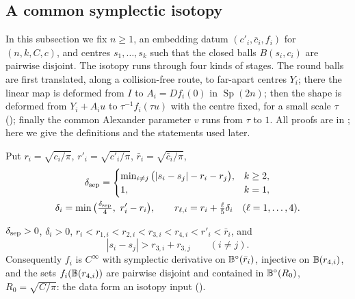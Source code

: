 \subsection{A common symplectic isotopy}\label{sec:ham-isotopy}

In this subsection we fix $n\ge1$, an embedding datum $(c'_i,\bar c_i,f_i)$ for $(n,k,C,c)$, and centres
$s_1,\dots,s_k$ such that the closed balls $B(s_i,c_i)$ are pairwise disjoint. The isotopy runs through four kinds
of stages. The round balls are first translated, along a collision-free route, to far-apart centres $Y_i$; there
the linear map is deformed from $I$ to $A_i=Df_i(0)$ in $\operatorname{Sp}(2n)$; then the shape is deformed from
$Y_i+A_iu$ to $\tau^{-1}f_i(\tau u)$ with the centre fixed, for a small scale $\tau$
(); finally the common Alexander parameter $v$ runs from $\tau$ to $1$. All proofs are
in ; here we give the definitions and the statements used later.

\begin{definition}[Radii]\label{def:ham-radii}
Put $r_i=\sqrt{c_i/\pi}$, $r'_i=\sqrt{c'_i/\pi}$, $\bar r_i=\sqrt{\bar c_i/\pi}$,
\[
\begin{gathered}
 \delta_{\rm sep}=\begin{cases}\min_{i\ne j}\big(|s_i-s_j|-r_i-r_j\big),&k\ge2,\\ 1,&k=1,\end{cases}\\
 \delta_i=\min\big(\tfrac{\delta_{\rm sep}}4,\ r'_i-r_i\big),\qquad r_{\ell,i}=r_i+\tfrac{\ell}{5}\delta_i\quad(\ell=1,\dots,4).
\end{gathered}
\]
\end{definition}

\begin{lemma}[Radii]\label{lem:ham-radii}
$\delta_{\rm sep}>0$, $\delta_i>0$, $r_i<r_{1,i}<r_{2,i}<r_{3,i}<r_{4,i}<r'_i<\bar r_i$, and
\begin{equation}\label{eq:ham-start-sep}
 |s_i-s_j|>r_{3,i}+r_{3,j}\qquad(i\ne j).
\end{equation}
Consequently $f_i$ is $C^\infty$ with symplectic derivative on $\mathbb{B}^\circ(\bar r_i)$, injective on $\mathbb{B}(r_{4,i})$, and the sets
$f_i(\mathbb{B}(r_{4,i}))$ are pairwise disjoint and contained in $\mathbb{B}^\circ(R_0)$, $R_0=\sqrt{C/\pi}$: the data form an isotopy
input ().
\end{lemma}

